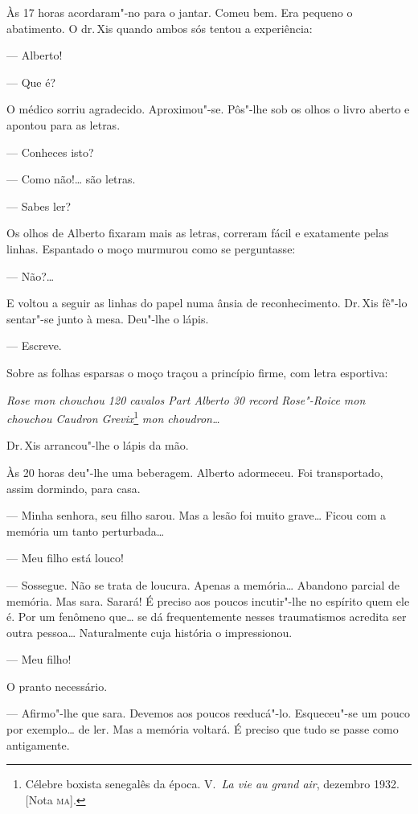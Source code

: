 Às 17 horas acordaram"-no para o jantar. Comeu bem. Era pequeno o
abatimento. O dr.\,Xis quando ambos sós tentou a experiência:

--- Alberto!

--- Que é?

O médico sorriu agradecido. Aproximou"-se. Pôs"-lhe sob os olhos o livro
aberto e apontou para as letras.

--- Conheces isto?

--- Como não!\ldots{} são letras.

--- Sabes ler?

Os olhos de Alberto fixaram mais as letras, correram fácil e exatamente
pelas linhas. Espantado o moço murmurou como se perguntasse:

--- Não?\ldots{}

E voltou a seguir as linhas do papel numa ânsia de reconhecimento. Dr.\,Xis fê"-lo sentar"-se junto à mesa. Deu"-lhe o lápis.

--- Escreve.

Sobre as folhas esparsas o moço traçou a princípio firme, com letra
esportiva:

\emph{Rose mon chouchou 120 cavalos Part Alberto 30 record Rose"-Roice
mon chouchou Caudron Grevix}\footnote{Célebre boxista senegalês da
  época. V.~\emph{La vie au grand air}, dezembro 1932. {[}Nota \textsc{ma}{]}.}
\emph{mon choudron\ldots{}}

Dr.\,Xis arrancou"-lhe o lápis da mão.

Às 20 horas deu"-lhe uma beberagem. Alberto adormeceu. Foi transportado,
assim dormindo, para casa.

--- Minha senhora, seu filho sarou. Mas a lesão foi muito grave\ldots{} Ficou
com a memória um tanto perturbada\ldots{}

--- Meu filho está louco!

--- Sossegue. Não se trata de loucura. Apenas a memória\ldots{} Abandono
parcial de memória. Mas sara. Sarará! É preciso aos poucos incutir"-lhe
no espírito quem ele é. Por um fenômeno que\ldots{} se dá frequentemente
nesses traumatismos acredita ser outra pessoa\ldots{} Naturalmente cuja
história o impressionou.

--- Meu filho!

O pranto necessário.

--- Afirmo"-lhe que sara. Devemos aos poucos reeducá"-lo. Esqueceu"-se um
pouco por exemplo\ldots{} de ler. Mas a memória voltará. É preciso que tudo
se passe como antigamente.

